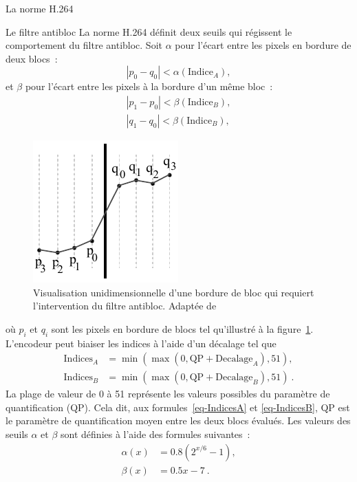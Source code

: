 \begin{chapter}{La norme H.264}
\begin{section}{Le filtre antibloc}
La norme H.264 définit deux seuils qui régissent le comportement du filtre
antibloc. Soit $\alpha$ pour l'écart entre les pixels en bordure de deux
blocs~:
\begin{equation}
\left| p_0 - q_0 \right| < \alpha(\text{Indice}_A),
\end{equation}
et $\beta$ pour l'écart entre les pixels à la bordure d'un même bloc~:
\begin{align}
\left| p_1 - p_0 \right| < \beta(\text{Indice}_B),\\
\left| q_1 - q_0 \right| < \beta(\text{Indice}_B),
\end{align}
\begin{figure}
\centering
\includegraphics{images/BlockyEdge.pdf}
\caption[Bordure d'un bloc qui requiert le filtre antibloc]{Visualisation
unidimensionnelle d'une bordure de bloc qui requiert l'intervention du filtre
antibloc. Adaptée de \citet[p.~616]{list2003}}
\label{fig-BlockyEdge}
\end{figure}
où $p_i$ et $q_i$ sont les pixels en bordure de blocs tel qu'illustré à la
figure~\ref{fig-BlockyEdge}. L'encodeur peut biaiser les indices à l'aide
d'un décalage tel que
\begin{align}
\label{eq-IndicesA}
\text{Indices}_A &= \min(\max(0,\text{QP}+\text{Decalage}_A), 51),\\
\label{eq-IndicesB}
\text{Indices}_B &= \min(\max(0,\text{QP}+\text{Decalage}_B), 51)\:.
\end{align}
La plage de valeur de 0 à 51 représente les valeurs possibles du paramètre de
quantification (QP). Cela dit, aux formules~\ref{eq-IndicesA} et
\ref{eq-IndicesB}, QP est le paramètre de quantification moyen entre les deux
blocs évalués. Les valeurs des seuils $\alpha$ et $\beta$ sont définies à l'aide
des formules suivantes~:
\begin{align}
\alpha(x) &= 0.8(2^{x/6}-1),\\
\beta(x) &= 0.5x-7\:.
\end{align}


\end{section}
\end{chapter}
